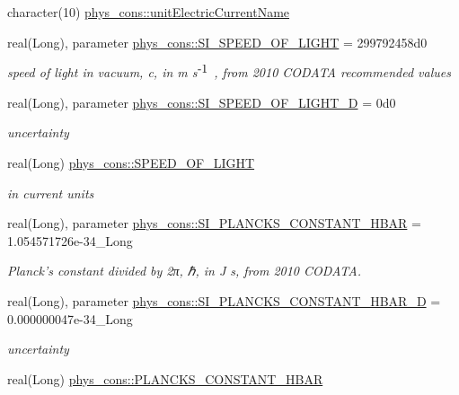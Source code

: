 \begin{DoxyCompactItemize}
\item 
character(10) \hyperlink{namespacephys__cons_a90b38082ef08e473377594f1485a86ad}{phys\_\-cons::unitElectricCurrentName}
\item 
real(Long), parameter \hyperlink{namespacephys__cons_ae265fad966cfc841f9a073a52955d742}{phys\_\-cons::SI\_\-SPEED\_\-OF\_\-LIGHT} = 299792458d0
\begin{DoxyCompactList}\small\item\em speed of light in vacuum, c, in m s$^{\mbox{-\/1}}$ , from 2010 CODATA recommended values \item\end{DoxyCompactList}\item 
real(Long), parameter \hyperlink{namespacephys__cons_a5547546b06eb8853e52e304b25cc7596}{phys\_\-cons::SI\_\-SPEED\_\-OF\_\-LIGHT\_\-D} = 0d0
\begin{DoxyCompactList}\small\item\em uncertainty \item\end{DoxyCompactList}\item 
real(Long) \hyperlink{namespacephys__cons_ac31faa4bb5e82aecbdffa3b3d43a1736}{phys\_\-cons::SPEED\_\-OF\_\-LIGHT}
\begin{DoxyCompactList}\small\item\em in current units \item\end{DoxyCompactList}\item 
real(Long), parameter \hyperlink{namespacephys__cons_ab49e79c21c913c5857dedf2c555d2c21}{phys\_\-cons::SI\_\-PLANCKS\_\-CONSTANT\_\-HBAR} = 1.054571726e-\/34\_\-Long
\begin{DoxyCompactList}\small\item\em Planck's constant divided by 2π, ℏ, in J s, from 2010 CODATA. \item\end{DoxyCompactList}\item 
real(Long), parameter \hyperlink{namespacephys__cons_af8ab82739d58ac3a1e1d9c97d3cfb4da}{phys\_\-cons::SI\_\-PLANCKS\_\-CONSTANT\_\-HBAR\_\-D} = 0.000000047e-\/34\_\-Long
\begin{DoxyCompactList}\small\item\em uncertainty \item\end{DoxyCompactList}\item 
real(Long) \hyperlink{namespacephys__cons_af0b754235993060b14fc81b7d1f702a5}{phys\_\-cons::PLANCKS\_\-CONSTANT\_\-HBAR}

\end{DoxyCompactItemize}
